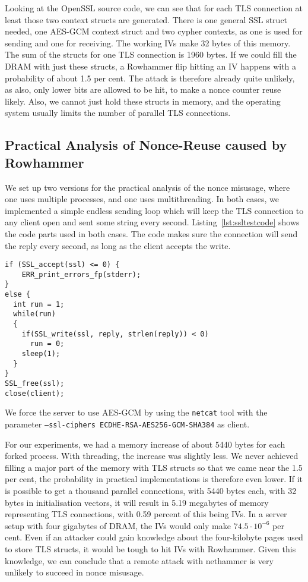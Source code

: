 Looking at the OpenSSL source code, we can see that for each TLS connection at
least those two context structs are generated. There is one general SSL struct
needed, one AES-GCM context struct and two cypher contexts, as one is used for
sending and one for receiving. The working IVs make 32 bytes of this memory. The
sum of the structs for one TLS connection is 1960 bytes. If we could fill the
DRAM with just these structs, a Rowhammer flip hitting an IV happens with a
probability of about 1.5 per cent. The attack is therefore already quite
unlikely, as also, only lower bits are allowed to be hit, to make a nonce
counter reuse likely. Also, we cannot just hold these structs in memory, and the
operating system usually limits the number of parallel TLS connections.

\subsection{Practical Analysis of Nonce-Reuse caused by Rowhammer}

We set up two versions for the practical analysis of the nonce misusage, where
one uses multiple processes, and one uses multithreading. In both cases, we
implemented a simple endless sending loop which will keep the TLS connection to
any client open and sent some string every second. Listing~\ref{lst:ssltestcode}
shows the code parts used in both cases. The code makes sure the connection will
send the reply every second, as long as the client accepts the write.

\begin{minipage}{\linewidth}
\begin{lstlisting}[style=CStyle,
                   caption={},
                   label={lst:ssltestcode}]
if (SSL_accept(ssl) <= 0) {
    ERR_print_errors_fp(stderr);
}
else {
  int run = 1;
  while(run)
  {
    if(SSL_write(ssl, reply, strlen(reply)) < 0)
      run = 0;
    sleep(1);
  }
}
SSL_free(ssl);
close(client);
\end{lstlisting}
\end{minipage}

We force the server to use AES-GCM by using the \texttt{netcat} tool with the
parameter \texttt{--ssl-ciphers ECDHE-RSA-AES256-GCM-SHA384} as client.

For our experiments, we had a memory increase of about 5440 bytes for each
forked process. With threading, the increase was slightly less. We never
achieved filling a major part of the memory with TLS structs so that we came
near the 1.5 per cent, the probability in practical implementations is therefore
even lower. If it is possible to get a thousand parallel connections, with 5440
bytes each, with 32 bytes in initialisation vectors, it will result in 5.19
megabytes of memory representing TLS connections, with 0.59 percent of this
being IVs. In a server setup with four gigabytes of DRAM, the IVs would only
make $74.5\cdot10^{-6}$ per cent. Even if an attacker could gain knowledge
about the four-kilobyte pages used to store TLS structs, it would be tough to
hit IVs with Rowhammer. Given this knowledge, we can conclude that a remote
attack with nethammer is very unlikely to succeed in nonce misusage.

